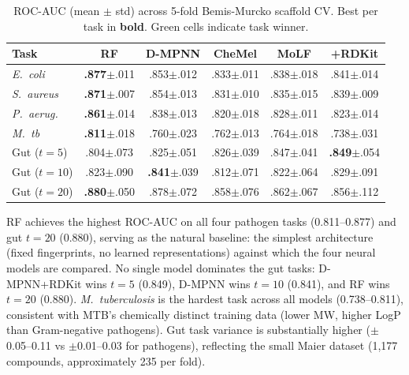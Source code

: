 \documentclass{article}
\begin{document}
\begin{table}[t]
\caption{ROC-AUC (mean $\pm$ std) across 5-fold Bemis-Murcko scaffold CV. Best per task in \textbf{bold}. Green cells indicate task winner.}
\label{tab:rocauc}
\vskip 0.1in
\centering
\scriptsize
\setlength{\tabcolsep}{3pt}
\begin{tabular}{lccccc}
\toprule
\textbf{Task} & \textbf{RF} & \textbf{D-MPNN} & \textbf{CheMel} & \textbf{MoLF} & \textbf{+RDKit} \\
\midrule
\textit{E.~coli}      & \textbf{.877}{\tiny$\pm$.011} & .853{\tiny$\pm$.012} & .833{\tiny$\pm$.011} & .838{\tiny$\pm$.018} & .841{\tiny$\pm$.014} \\
\textit{S.~aureus}    & \textbf{.871}{\tiny$\pm$.007} & .854{\tiny$\pm$.013} & .831{\tiny$\pm$.010} & .835{\tiny$\pm$.015} & .839{\tiny$\pm$.009} \\
\textit{P.~aerug.}    & \textbf{.861}{\tiny$\pm$.014} & .838{\tiny$\pm$.013} & .820{\tiny$\pm$.018} & .828{\tiny$\pm$.011} & .823{\tiny$\pm$.014} \\
\textit{M.~tb}        & \textbf{.811}{\tiny$\pm$.018} & .760{\tiny$\pm$.023} & .762{\tiny$\pm$.013} & .764{\tiny$\pm$.018} & .738{\tiny$\pm$.031} \\
\midrule
Gut ($t{=}5$)  & .804{\tiny$\pm$.073} & .825{\tiny$\pm$.051} & .826{\tiny$\pm$.039} & .847{\tiny$\pm$.041} & \textbf{.849}{\tiny$\pm$.054} \\
Gut ($t{=}10$) & .823{\tiny$\pm$.090} & \textbf{.841}{\tiny$\pm$.039} & .812{\tiny$\pm$.071} & .822{\tiny$\pm$.064} & .829{\tiny$\pm$.091} \\
Gut ($t{=}20$) & \textbf{.880}{\tiny$\pm$.050} & .878{\tiny$\pm$.072} & .858{\tiny$\pm$.076} & .862{\tiny$\pm$.067} & .856{\tiny$\pm$.112} \\
\bottomrule
\end{tabular}
\end{table}

RF achieves the highest ROC-AUC on all four pathogen tasks (0.811--0.877) and gut $t{=}20$ (0.880), serving as the natural baseline: the simplest architecture (fixed fingerprints, no learned representations) against which the four neural models are compared.
No single model dominates the gut tasks: D-MPNN+RDKit wins $t{=}5$ (0.849), D-MPNN wins $t{=}10$ (0.841), and RF wins $t{=}20$ (0.880).
\textit{M.~tuberculosis} is the hardest task across all models (0.738--0.811), consistent with MTB's chemically distinct training data (lower MW, higher LogP than Gram-negative pathogens).
Gut task variance is substantially higher ($\pm$0.05--0.11 vs $\pm$0.01--0.03 for pathogens), reflecting the small Maier dataset (1,177 compounds, approximately 235 per fold).
\end{document}
